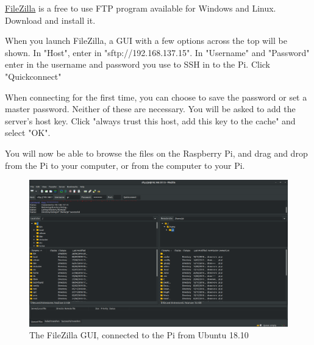 \href{https://filezilla-project.org/}{FileZilla} is a free to use FTP program available for Windows and Linux. Download and install it.

When you launch FileZilla, a GUI with a few options across the top will be shown. In "Host", enter in "sftp://192.168.137.15". In "Username" and "Password" enter in the username and password you use to SSH in to the Pi. Click "Quickconnect"

When connecting for the first time, you can choose to save the password or set a master password. Neither of these are necessary.
You will be asked to add the server's host key. Click "always trust this host, add this key to the cache" and select "OK".

You will now be able to browse the files on the Raspberry Pi, and drag and drop from the Pi to your computer, or from the computer to your Pi.

\begin{figure}[H]
\centering
\includegraphics[width=1\columnwidth]{Figures/filezilla}
\caption{The FileZilla GUI, connected to the Pi from Ubuntu 18.10}
\label{fig:filezilla}
\end{figure}
